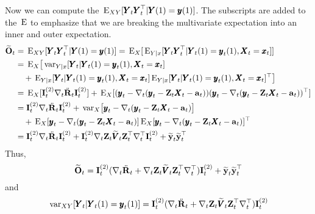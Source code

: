 \documentclass[]{article}
\def\ZZ{\mbox{$\mathbf Z$}}	\def\zz{\mbox{$\mathbf z$}}
\def\IIm{\mbox{$\mathbf I$}}
\def\OO{\mbox{$\mathbf O$}}
\def\RR{\mbox{$\mathbf R$}}	 \def\rr{\mbox{$\mathbf r$}}
\def\VV{\mbox{$\pmb{V}$}}	\def\vv{\mbox{$\pmb{v}$}}
\def\XX{\mbox{$\pmb{X}$}}	\def\xx{\mbox{$\pmb{x}$}}
\def\YY{\mbox{$\pmb{Y}$}}	\def\yy{\mbox{$\pmb{y}$}}
\def\E{\,\textup{\textrm{E}}}
\def\var{\,\textup{\textrm{var}}}
\def\hatyt{\widetilde{\mbox{$\mathbf y$}}_t}
\def\hatOt{\widetilde{\OO}_t}
\def\hatVt{\widetilde{\VV}_t}
\def\IR{\nabla}
\begin{document}
Now we can compute the $\E_{XY}[\YY_t\YY_t^\top|\YY(1)=\yy(1)]$.  The subscripts are added to the $\E$ to emphasize that we are breaking the multivariate expectation into an inner and outer expectation.
\begin{equation}
\begin{split}
\hatOt&=\E_{XY}[\YY_t\YY_t^\top|\YY(1)=\yy(1)]=\E_X[\E_{Y|x}[\YY_t\YY_t^\top|\YY_t(1)=\yy_t(1),\XX_t=\xx_t]]\\
&=\E_X\bigl[\var_{Y|x}[\YY_t|\YY_t(1)=\yy_t(1),\XX_t=\xx_t] \\
&\quad + \E_{Y|x}[\YY_t|\YY_t(1)=\yy_t(1),\XX_t=\xx_t]
\E_{Y|x}[\YY_t|\YY_t(1)=\yy_t(1),\XX_t=\xx_t]^\top\bigr]\\
&=\E_X[\IIm_t^{(2)}\IR_t\ddot{\RR}_t\IIm_t^{(2)}] +\E_X[(\yy_t-\IR_t(\yy_t-\ZZ_t\XX_t-\aa_t))(\yy_t-\IR_t(\yy_t-\ZZ_t\XX_t-\aa_t))^\top]\\
&=\IIm_t^{(2)}\IR_t\ddot{\RR}_t\IIm_t^{(2)} + \var_X\bigl[\yy_t-\IR_t(\yy_t-\ZZ_t\XX_t-\aa_t)\bigr]\\ &\quad +\E_X[\yy_t-\IR_t(\yy_t-\ZZ_t\XX_t-\aa_t)]\E_X[\yy_t-\IR_t(\yy_t-\ZZ_t\XX_t-\aa_t)]^\top\\
&=\IIm_t^{(2)}\IR_t\ddot{\RR}_t\IIm_t^{(2)}  + \IIm_t^{(2)}\IR_t\ZZ_t\hatVt\ZZ_t^\top\IR_t^\top\IIm_t^{(2)} + \hatyt\hatyt^\top  \\
\end{split}
\end{equation}
Thus,
\begin{equation}
\hatOt=\IIm_t^{(2)}(\IR_t\ddot{\RR}_t + \IR_t\ZZ_t\hatVt\ZZ_t^\top\IR_t^\top)\IIm_t^{(2)}  +  \hatyt\hatyt^\top  \\
\end{equation}
and 
\begin{equation}\label{eq:cond.var.Y}
\var_{XY}[\YY_t|\YY_t(1)=\yy_t(1)] = \IIm_t^{(2)}(\IR_t\ddot{\RR}_t + \IR_t\ZZ_t\hatVt\ZZ_t^\top\IR_t^\top)\IIm_t^{(2)}
\end{equation}
\end{document}
